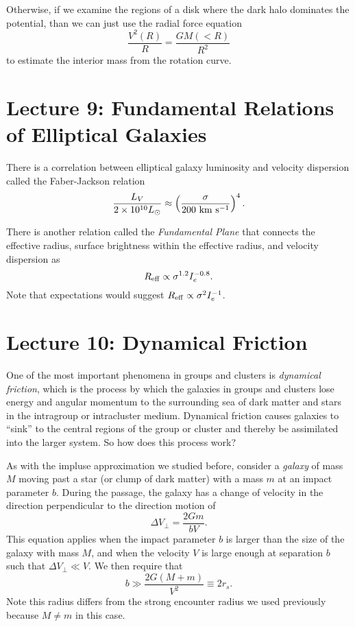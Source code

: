 \documentclass[]{article}
\begin{document}
Otherwise, if we examine the regions of a disk where the dark halo dominates the potential, than we can just use
the radial force equation
\begin{equation}
\frac{V^2(R)}{R} = \frac{GM(<R)}{R^2}
\end{equation}
\noindent 
to estimate the interior mass from the rotation curve.

\section{Lecture 9: Fundamental Relations of Elliptical Galaxies}

There is a correlation between elliptical galaxy luminosity and
velocity dispersion called the Faber-Jackson relation
\begin{equation}
\frac{L_V}{2\times10^{10}L_{\odot}} \approx \left( \frac{\sigma}{200~\mathrm{km}~\mathrm{s}^{-1}}\right)^{4}.
\end{equation}

There is another relation called the {\it Fundamental Plane} that
connects the effective radius, surface brightness within the effective
radius, and velocity dispersion as
\begin{equation}
R_{\mathrm{eff}} \propto \sigma^{1.2} I_{e}^{-0.8}.
\end{equation}
Note that expectations would suggest $R_{\mathrm{eff}} \propto \sigma^2 I_{e}^{-1}$.

\section{Lecture 10: Dynamical Friction}

One of the most important phenomena in groups and clusters is
{\it dynamical friction}, which is the process by which the
galaxies in groups and clusters lose energy and angular momentum
to the surrounding sea of dark matter and stars in the intragroup
or intracluster medium. Dynamical friction causes galaxies to ``sink''
to the central regions of the group or cluster and thereby be
assimilated into the larger system.  So how does this process work?

As with the impluse approximation we studied before, consider a
{\it galaxy} of mass $M$ moving past a star (or clump of dark matter)
with a mass $m$ at an impact parameter $b$.  During the passage, the
galaxy has a change of velocity in the direction perpendicular to the
direction motion of
\begin{equation}
\Delta V_{\perp} = \frac{2Gm}{bV}.
\end{equation}
\noindent
This equation applies when the impact parameter $b$ is larger than the
size of the galaxy with mass $M$, and when the velocity $V$ is large
enough at separation $b$ such that $\Delta V_{\perp}\ll V$.  We then
require that
\begin{equation}
b \gg \frac{2G(M+m)}{V^2} \equiv 2 r_s.
\end{equation}
\noindent
Note this radius differs from the strong encounter radius we used
previously because $M\ne m$ in this case.
\end{document}
